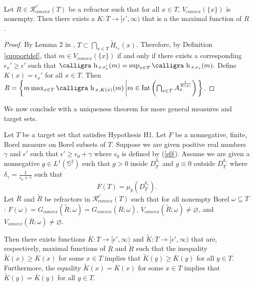 \documentclass[review]{elsarticle}
\DeclareMathOperator*{\Int}{Int}
\newcommand{\h}{\text{\calligra h}\,}
\begin{document}
 \begin{lemma}\label{max-func-lemma}
     Let $R\in\mathcal{R}_{convex}^{\epsilon'}(T)$ be a refractor such that for all $x\in T$, $V_{convex}(\{x\})$ is nonempty. Then there exists a $K:T\to[\epsilon', \infty)$ that is a the maximal function of $R$.
 \end{lemma}
 \begin{proof}
 By Lemma 2 in \cite{KOT}, $T\subset \bigcap_{x\in T} \tilde{H}_{\epsilon_x}(x)$. Therefore, by Definition \ref{supportdef}, that $m\in V_{convex}(\{x\})$ if and only if there exists a corresponding $\epsilon_x'\ge\epsilon'$ such that $\h_{x,\epsilon_x'}(m) =\sup_{x\in T} \h_{x,\epsilon_x}(m).$ Define $K(x)=\epsilon_x'$ for all $x\in T.$ Then $R=\left\{m\max_{x\in T}\h_{x,K(x)}(m)\left|m\in \Int\left(\bigcap_{x\in T} A_x^{\frac1{K(x)}}\right)\right.\right\}$.
 \end{proof}
 
 
 We now conclude with a uniqueness theorem for more general measures and target sets.

\begin{theorem}\label{unique-continuous}
    Let $T $ be a target set that satisfies Hypothesis H1. Let $F$ be a nonnegative, finite, Borel measure on Borel subsets of $T.$ Suppose we are given positive real numbers $\gamma$ and $\epsilon'$ such that $\epsilon'\ge \epsilon_0+\gamma$ where $\epsilon_0$ is defined by (\ref{e0}).  Assume we are given a nonnegative $g\in L^1(\mathbb{S}^2)$ such that $g>0$ inside $D_T^{\delta_\gamma}$ and $g\equiv 0$ outside $D_T^{\delta_\gamma}$ where $\delta_\gamma=\frac1{\epsilon_0+\gamma}$ such that 
    \begin{equation}
        F(T) = \mu_{g}(D_T^{\delta_\gamma}).
    \end{equation}
    Let $\overline{R}$ and $\tilde{R}$ be refractors in $\mathcal{R}_{convex}^{\epsilon'}(T)$ such that for all nonempty Borel $\omega \subseteq T$: $F(\omega)=G_{convex}(\tilde{R};\omega)=G_{convex}(\overline{R};\omega)$, $V_{convex}(\tilde{R};\omega)\neq \varnothing$, and $V_{convex}(\overline{R};\omega)\neq \varnothing$. 
    
    Then there exists functions $\overline{K}:T\to[\epsilon', \infty)$ and $\tilde{K}:T\to[\epsilon', \infty)$ that are, respectively, maximal functions of $\overline{R}$ and $\tilde{R}$ such that the inequality $\tilde{K}(x)\ge \overline{K}(x)$ for some $x\in T$ implies that $\tilde{K}(y)\ge \overline{K}(y)$ for all $y\in T.$ Furthermore, the equality $\tilde{K}(x)= \overline{K}(x)$ for some $x\in T$ implies that $\tilde{K}(y)= \overline{K}(y)$ for all $y\in T.$
\end{theorem}
\end{document}

